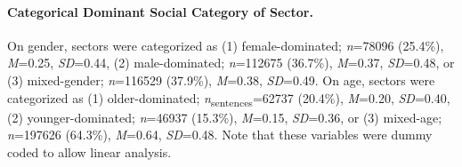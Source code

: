 \documentclass[man]{apa7}
\begin{document}
\paragraph{Categorical Dominant Social Category of Sector.}
\label{ivs_dummy}
On gender, sectors were categorized as (1) female-dominated; \textit{n}=78096 (25.4\%), \textit{M}=0.25, \textit{SD}=0.44, (2) male-dominated; \textit{n}=112675 (36.7\%), \textit{M}=0.37, \textit{SD}=0.48, or (3) mixed-gender; \textit{n}=116529 (37.9\%), \textit{M}=0.38, \textit{SD}=0.49. On age, sectors were categorized as (1) older-dominated; \textit{n}\textsubscript{sentences}=62737 (20.4\%), \textit{M}=0.20, \textit{SD}=0.40, (2) younger-dominated; \textit{n}=46937 (15.3\%), \textit{M}=0.15, \textit{SD}=0.36, or (3) mixed-age; \textit{n}=197626 (64.3\%), \textit{M}=0.64, \textit{SD}=0.48. Note that these variables were dummy coded to allow linear analysis.
\end{document}
